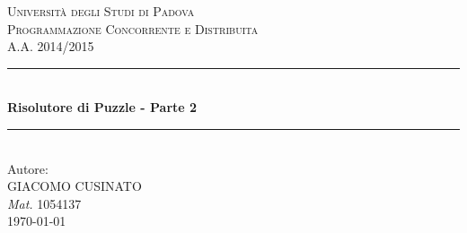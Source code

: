 \documentclass[12pt]{article} %
\begin{document}

	\begin{titlepage}

		\newcommand{\HRule}{\rule{\linewidth}{0.5mm}} %

		\center %

		\textsc{\LARGE Università degli Studi di Padova}\\[1.5cm] %
		\textsc{\Large Programmazione Concorrente e Distribuita}\\[0.5cm] %
		\textsc{\large A.A. 2014/2015}\\[0.5cm] %

		\HRule \\[0.8cm]
		{ \huge \bfseries Risolutore di Puzzle - Parte 2}\\[0.4cm] %
		\HRule \\[1.5cm]


		Autore: \\[\baselineskip]
		{\Large GIACOMO CUSINATO }\\
		{\large \emph{Mat.} 1054137 }\\[4cm] %

		{\large \today}\\[3cm] %

		\vfill %

	\end{titlepage}


	\tableofcontents %

	\newpage %


	
	
\end{document}
